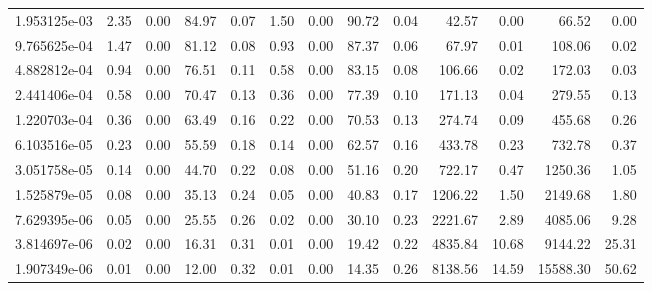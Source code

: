 \begin{tabular}{lrrrrrrrrrrrr}
1.953125e-03 &        2.35 &        0.00 &         84.97 &          0.07 &           1.50 &           0.00 &        90.72 &         0.04 &            42.57 &             0.00 &           66.52 &            0.00 \\
9.765625e-04 &        1.47 &        0.00 &         81.12 &          0.08 &           0.93 &           0.00 &        87.37 &         0.06 &            67.97 &             0.01 &          108.06 &            0.02 \\
4.882812e-04 &        0.94 &        0.00 &         76.51 &          0.11 &           0.58 &           0.00 &        83.15 &         0.08 &           106.66 &             0.02 &          172.03 &            0.03 \\
2.441406e-04 &        0.58 &        0.00 &         70.47 &          0.13 &           0.36 &           0.00 &        77.39 &         0.10 &           171.13 &             0.04 &          279.55 &            0.13 \\
1.220703e-04 &        0.36 &        0.00 &         63.49 &          0.16 &           0.22 &           0.00 &        70.53 &         0.13 &           274.74 &             0.09 &          455.68 &            0.26 \\
6.103516e-05 &        0.23 &        0.00 &         55.59 &          0.18 &           0.14 &           0.00 &        62.57 &         0.16 &           433.78 &             0.23 &          732.78 &            0.37 \\
3.051758e-05 &        0.14 &        0.00 &         44.70 &          0.22 &           0.08 &           0.00 &        51.16 &         0.20 &           722.17 &             0.47 &         1250.36 &            1.05 \\
1.525879e-05 &        0.08 &        0.00 &         35.13 &          0.24 &           0.05 &           0.00 &        40.83 &         0.17 &          1206.22 &             1.50 &         2149.68 &            1.80 \\
7.629395e-06 &        0.05 &        0.00 &         25.55 &          0.26 &           0.02 &           0.00 &        30.10 &         0.23 &          2221.67 &             2.89 &         4085.06 &            9.28 \\
3.814697e-06 &        0.02 &        0.00 &         16.31 &          0.31 &           0.01 &           0.00 &        19.42 &         0.22 &          4835.84 &            10.68 &         9144.22 &           25.31 \\
1.907349e-06 &        0.01 &        0.00 &         12.00 &          0.32 &           0.01 &           0.00 &        14.35 &         0.26 &          8138.56 &            14.59 &        15588.30 &           50.62 \\

\end{tabular}
